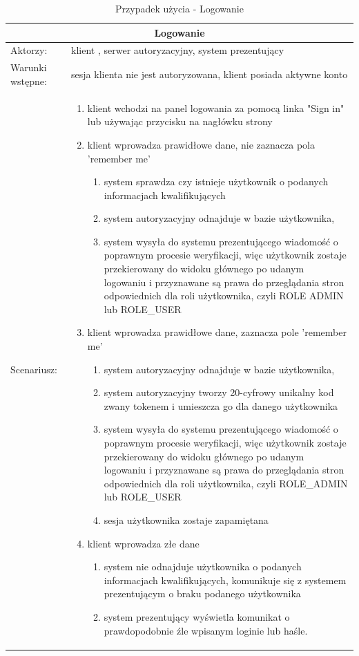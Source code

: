 \begin{table}[h!]
	\begin{tabular}{ |p{2cm}||p{13cm}|  }
		
		\hline
		\multicolumn{2}{|c|}{Logowanie} \\
		\hline
		Aktorzy: &klient , serwer autoryzacyjny, system prezentujący\\
		\hline
		Warunki wstępne: & sesja klienta nie jest autoryzowana, klient posiada aktywne konto\\
		\hline
		Scenariusz: &
		\begin{enumerate}
			\item klient wchodzi na panel logowania za pomocą linka "Sign in" lub używając przycisku na nagłówku strony 
			\item klient wprowadza prawidłowe dane, nie zaznacza pola 'remember me'
			\begin{enumerate}
				\item system sprawdza czy istnieje użytkownik o podanych informacjach kwalifikujących
				\item system autoryzacyjny odnajduje w bazie użytkownika,
				\item system wysyła do systemu prezentującego wiadomość o poprawnym procesie weryfikacji, więc użytkownik zostaje przekierowany do widoku głównego po udanym logowaniu i przyznawane są prawa do przeglądania stron odpowiednich dla roli użytkownika, czyli ROLE ADMIN lub ROLE\_USER
			\end{enumerate}
			\item klient wprowadza prawidłowe dane, zaznacza pole 'remember me'	
			\begin{enumerate}
				\item system autoryzacyjny odnajduje w bazie użytkownika,
				\item system autoryzacyjny tworzy 20-cyfrowy unikalny kod zwany tokenem i umieszcza go dla danego użytkownika
				\item system wysyła do systemu prezentującego wiadomość o poprawnym procesie weryfikacji, więc użytkownik zostaje przekierowany do widoku głównego po udanym logowaniu i przyznawane są prawa do przeglądania stron odpowiednich dla roli użytkownika, czyli ROLE\_ADMIN lub ROLE\_USER
				\item sesja użytkownika zostaje zapamiętana
			\end{enumerate}
			\item klient wprowadza złe dane
			\begin{enumerate}
				\item	system nie odnajduje użytkownika o podanych informacjach kwalifikujących, komunikuje się z systemem prezentującym o braku podanego użytkownika
				\item system prezentujący wyświetla komunikat o prawdopodobnie źle wpisanym loginie lub haśle.
			\end{enumerate}
		\end{enumerate}
		\\
		\hline
		
	\end{tabular}
	\caption{Przypadek użycia - Logowanie}
\end{table}


